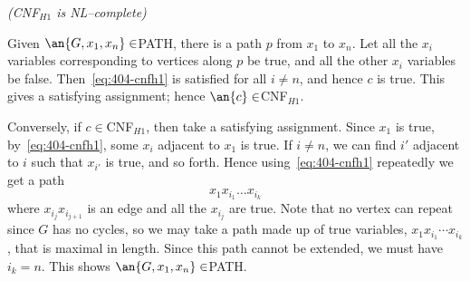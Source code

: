 \begin{problem}{\it(CNF${}_{H1}$ is NL--complete)}
\begin{enumerate}
Given $\an{G,x_1,x_n}\in$PATH, there is a path $p$ from $x_1$ to $x_n$. 
Let all the $x_i$ variables corresponding to vertices along $p$ be true, and all the other $x_i$ variables be false. %
Then~\eqref{eq:404-cnfh1} is satisfied for all $i\ne n$, and hence $c$ is true. %
This gives a satisfying assignment; hence $\an{c}\in$CNF${}_{H1}$.

Conversely, if $c\in$CNF${}_{H1}$, then take a satisfying assignment. %
Since $x_1$ is true, by~\eqref{eq:404-cnfh1}, some $x_i$ adjacent to $x_1$ is true. If $i\ne n$, we can find $i'$ adjacent to $i$ such that $x_{i'}$ is true, and so forth. Hence using~\eqref{eq:404-cnfh1} repeatedly we get a path 
\[
x_1x_{i_1}\ldots x_{i_k}
\]
where $x_{i_j}x_{i_{j+1}}$ is an edge and all the $x_{i_j}$ are true. Note that no vertex can repeat since $G$ has no cycles, so we may take a path made up of true variables, $x_1x_{i_1}\cdots x_{i_k}$, that is maximal in length. %
Since this path cannot be extended, we must have $i_k=n$. 
 This shows $\an{G,x_1,x_n}\in$PATH.
\end{enumerate}
\end{problem}

\pagebreak

